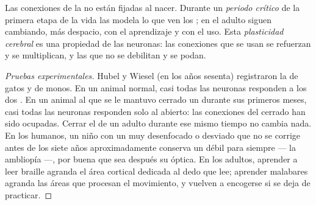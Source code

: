 \begin{proposition}[La plasticidad]\label{prop:g11:vision-and-brain:plasticity}
Las conexiones de la  no están fijadas al nacer. Durante
un \emph{periodo crítico} de la primera etapa de la vida las modela lo
que ven los ; en el adulto siguen cambiando, más despacio, con el
aprendizaje y con el uso. Esta \emph{plasticidad
cerebral} es una propiedad de las neuronas:
las conexiones que se usan se refuerzan y se multiplican, y las que no
se debilitan y se podan.
\end{proposition}
\begin{proof}[Pruebas experimentales]
Hubel y Wiesel (en los años sesenta) registraron la  de
gatos y de monos. En un animal normal, casi todas las neuronas
responden a los dos . En un animal al que se le mantuvo cerrado un
 durante sus primeros meses, casi todas las neuronas responden solo
al  abierto: las conexiones del  cerrado han sido ocupadas.
Cerrar el  de un adulto durante ese mismo tiempo no cambia nada. En
los humanos, un niño con un  muy desenfocado o desviado que no se
corrige antes de los siete años aproximadamente conserva un  débil
para siempre --- la ambliopía ---, por buena que sea después su
óptica. En los adultos, aprender a leer braille agranda el área
cortical dedicada al dedo que lee; aprender malabares agranda las áreas
que procesan el movimiento, y vuelven a encogerse si se deja de
practicar.
\end{proof}

